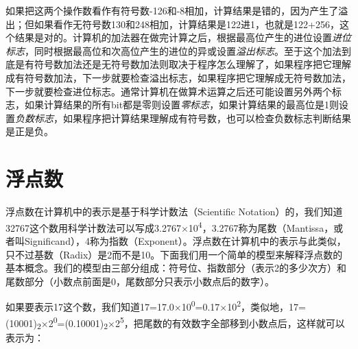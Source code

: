 

如果把这两个操作数看作有符号数-126和-8相加，计算结果是错的，因为产生了溢出；但如果看作无符号数130和248相加，计算结果是122进1，也就是122+\BookSplit{}256，这个结果是对的。计算机的加法器在做完计算之后，根据最高位产生的进位设置\emph{进位标志}，同时根据最高位和次高位产生的进位的异或设置\emph{溢出标志}。至于这个加法到底是有符号数加法还是无符号数加法则取决于程序怎么理解了，如果程序把它理解成有符号数加法，下一步就要检查溢出标志，如果程序把它理解成无符号数加法，下一步就要检查进位标志。通常计算机在做算术运算之后还可能设置另外两个标志，如果计算结果的所有bit都是零则设置\emph{零标志}，如果计算结果的最高位是1则设置\emph{负数标志}，如果程序把计算结果理解成有符号数，也可以检查负数标志判断结果是正是负。




\section{浮点数}
%
浮点数在计算机中的表示是基于科学计数法（Scientific Notation）的，我们知道32767这个数用科学计数法可以写成3.\BookSplit{}2767×\BookSplit{}10\textsuperscript{4}，3.\BookSplit{}2767称为尾数（Mantissa，或者叫Significand），4称为指数（Exponent）。浮点数在计算机中的表示与此类似，只不过基数（Radix）是2而不是10。下面我们用一个简单的模型来解释浮点数的基本概念。我们的模型由三部分组成：符号位、指数部分（表示2的多少次方）和尾数部分（小数点前面是0，尾数部分只表示小数点后的数字）。




如果要表示17这个数，我们知道17=\BookSplit{}17.\BookSplit{}0×\BookSplit{}10\textsuperscript{0}=0.\BookSplit{}17×\BookSplit{}10\textsuperscript{2}，类似地，17=\BookSplit{}(10001)\textsubscript{2}×2\textsuperscript{0}=(0.\BookSplit{}10001)\textsubscript{2}×2\textsuperscript{5}，把尾数的有效数字全部移到小数点后，这样就可以表示为：


